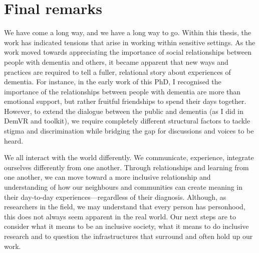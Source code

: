 \section{Final remarks}
\label{Discussion:FinalRemarks}
We have come a long way, and we have a long way to go. Within this thesis, the work has indicated tensions that arise in working within sensitive settings. As the work moved towards appreciating the importance of social relationships between people with dementia and others, it became apparent that new ways and practices are required to tell a fuller, relational story about experiences of dementia. For instance, in the early work of this PhD, I recognised the importance of the relationships between people with dementia are more than emotional support, but rather fruitful friendships to spend their days together. However, to extend the dialogue between the public and dementia (as I did in DemVR and toolkit), we require completely different structural factors to tackle stigma and discrimination while bridging the gap for discussions and voices to be heard. 

We all interact with the world differently. We communicate, experience, integrate ourselves differently from one another. Through relationships and learning from one another, we can move toward a more inclusive relationship and understanding of how our neighbours and communities can create meaning in their day-to-day experiences—regardless of their diagnosis. Although, as researchers in the field, we may understand that every person has personhood, this does not always seem apparent in the real world. Our next steps are to consider what it means to be an inclusive society, what it means to do inclusive research and to question the infrastructures that surround and often hold up our work.


